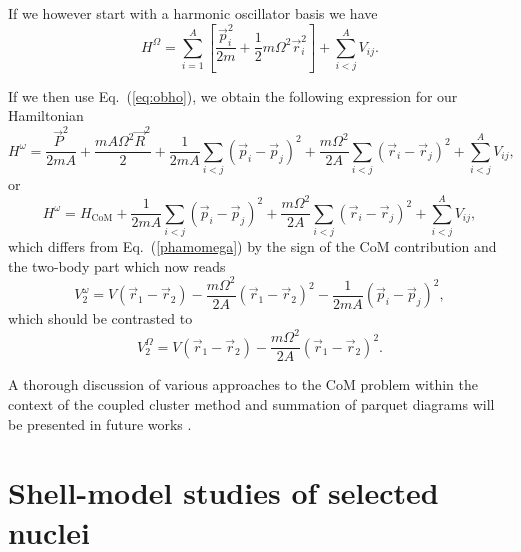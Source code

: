 \documentclass[twoside,12pt]{article}
\begin{document}
If we however start with a harmonic oscillator basis we
have
\begin{equation}
H^\Omega=\sum_{i=1}^A \left[ \frac{\vec{p}_i^2}{2m}
+\frac{1}{2}m\Omega^2 \vec{r}^2_i
\right] + \sum_{i<j}^A V_{ij}.
\label{newho}
\end{equation}

If we then use Eq.~(\ref{eq:obho}), we obtain the following expression
for our Hamiltonian
\begin{equation}
H^\omega=\frac{\vec{P}^2}{2mA}+\frac{mA\Omega^2\vec{R}^2}{2}
           +\frac{1}{2mA}\sum_{i<j}(\vec{p}_i-\vec{p}_j)^2
           +\frac{m\Omega^2}{2A}\sum_{i<j}(\vec{r}_i-\vec{r}_j)^2
           + \sum_{i<j}^A V_{ij},
\end{equation}
or 
\begin{equation}
H^\omega=H_{\mathrm{CoM}}
           +\frac{1}{2mA}\sum_{i<j}(\vec{p}_i-\vec{p}_j)^2
           +\frac{m\Omega^2}{2A}\sum_{i<j}(\vec{r}_i-\vec{r}_j)^2
           + \sum_{i<j}^A V_{ij},
\end{equation}
which differs from Eq.~(\ref{phamomega}) by the sign of the CoM contribution
and the two-body part which now reads
\begin{equation}
V_2^\omega=V(\vec{r}_1-\vec{r}_2)-\frac{m\Omega^2}{2A}(\vec{r}_1-\vec{r}_2)^2
-\frac{1}{2mA}(\vec{p}_i-\vec{p}_j)^2,
\end{equation}
which should be contrasted to 
\[
   V_2^\Omega=V(\vec{r}_1-\vec{r}_2)-\frac{m\Omega^2}{2A}(\vec{r}_1-\vec{r}_2)^2.
\]

A thorough discussion of various approaches to the CoM problem within the context of the 
coupled cluster method and summation of parquet diagrams will be presented in future 
works \cite{dean04}.




\section{Shell-model studies of selected nuclei}\label{sec:sec4}
\end{document}
